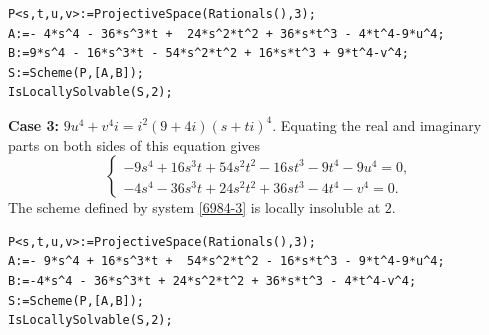 \documentclass[a4paper,12pt,english,reqno]{amsart}
\begin{document}
\begin{lstlisting}
P<s,t,u,v>:=ProjectiveSpace(Rationals(),3);
A:=- 4*s^4 - 36*s^3*t +  24*s^2*t^2 + 36*s*t^3 - 4*t^4-9*u^4;
B:=9*s^4 - 16*s^3*t - 54*s^2*t^2 + 16*s*t^3 + 9*t^4-v^4;
S:=Scheme(P,[A,B]);
IsLocallySolvable(S,2);
\end{lstlisting}

{\bf Case 3:} $9u^4+v^4i=i^2(9+4i)(s+ti)^4$. Equating the real and imaginary parts on both sides of this equation gives
\begin{equation}\label{6984-3}
\begin{cases}
-9s^4 + 16s^3t + 54s^2t^2 - 16st^3 - 9t^4 - 9u^4=0,\\
-4s^4 - 36s^3t + 24s^2t^2 + 36st^3 - 4t^4 - v^4=0.
\end{cases}
\end{equation}
The scheme defined by system \eqref{6984-3} is locally insoluble at $2$.


\begin{lstlisting}
P<s,t,u,v>:=ProjectiveSpace(Rationals(),3);
A:=- 9*s^4 + 16*s^3*t +  54*s^2*t^2 - 16*s*t^3 - 9*t^4-9*u^4;
B:=-4*s^4 - 36*s^3*t + 24*s^2*t^2 + 36*s*t^3 - 4*t^4-v^4;
S:=Scheme(P,[A,B]);
IsLocallySolvable(S,2);
\end{lstlisting}
\end{document}
